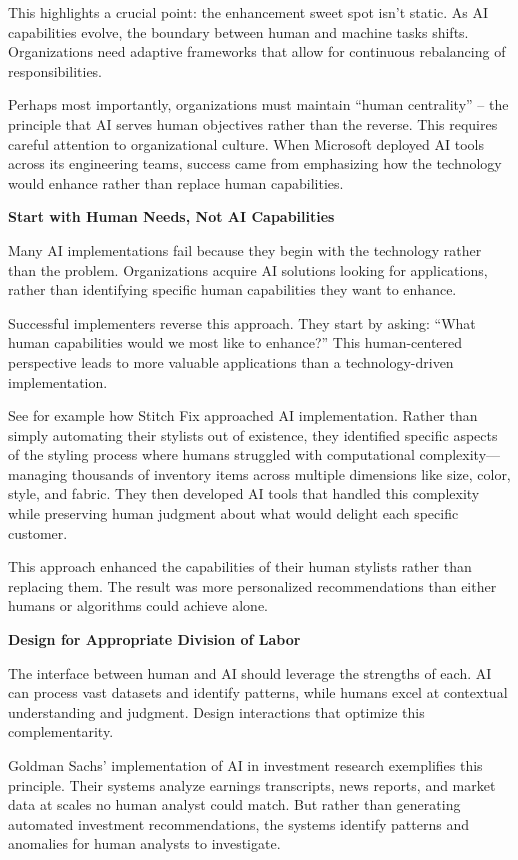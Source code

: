 \documentclass[
  Letterpaper,
]{scrbook}
\begin{document}
This highlights a crucial point: the enhancement sweet spot isn't
static. As AI capabilities evolve, the boundary between human and
machine tasks shifts. Organizations need adaptive frameworks that allow
for continuous rebalancing of responsibilities.

Perhaps most importantly, organizations must maintain ``human
centrality'' -- the principle that AI serves human objectives rather
than the reverse. This requires careful attention to organizational
culture. When Microsoft deployed AI tools across its engineering teams,
success came from emphasizing how the technology would enhance rather
than replace human capabilities.

\textbf{Start with Human Needs, Not AI Capabilities}

Many AI implementations fail because they begin with the technology
rather than the problem. Organizations acquire AI solutions looking for
applications, rather than identifying specific human capabilities they
want to enhance.

Successful implementers reverse this approach. They start by asking:
``What human capabilities would we most like to enhance?'' This
human-centered perspective leads to more valuable applications than a
technology-driven implementation.

See for example how Stitch Fix approached AI implementation. Rather than
simply automating their stylists out of existence, they identified
specific aspects of the styling process where humans struggled with
computational complexity---managing thousands of inventory items across
multiple dimensions like size, color, style, and fabric. They then
developed AI tools that handled this complexity while preserving human
judgment about what would delight each specific customer.

This approach enhanced the capabilities of their human stylists rather
than replacing them. The result was more personalized recommendations
than either humans or algorithms could achieve alone.

\textbf{Design for Appropriate Division of Labor}

The interface between human and AI should leverage the strengths of
each. AI can process vast datasets and identify patterns, while humans
excel at contextual understanding and judgment. Design interactions that
optimize this complementarity.

Goldman Sachs' implementation of AI in investment research exemplifies
this principle. Their systems analyze earnings transcripts, news
reports, and market data at scales no human analyst could match. But
rather than generating automated investment recommendations, the systems
identify patterns and anomalies for human analysts to investigate.
\end{document}
